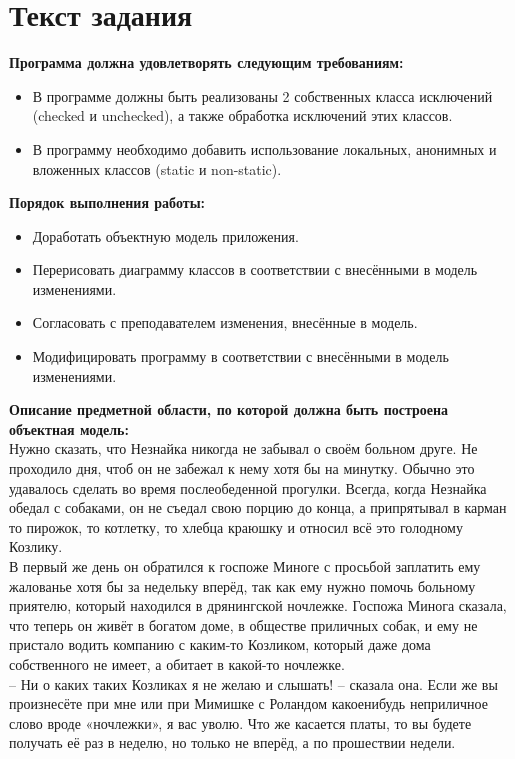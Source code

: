 \documentclass[12pt,onecolumn]{article}
\begin{document}
\section{Текст задания}
\textbf{Программа должна удовлетворять следующим требованиям:}
\begin{itemize}
  \item В программе должны быть реализованы 2 собственных класса исключений (checked и unchecked), а также обработка исключений этих классов.
  \item В программу необходимо добавить использование локальных, анонимных и вложенных классов (static и non-static).
\end{itemize}
\textbf{Порядок выполнения работы:}
\begin{itemize}
  \item Доработать объектную модель приложения.
  \item Перерисовать диаграмму классов в соответствии с внесёнными в модель изменениями.
  \item Согласовать с преподавателем изменения, внесённые в модель.
  \item Модифицировать программу в соответствии с внесёнными в модель изменениями.
\end{itemize}
\textbf{Описание предметной области, по которой должна быть построена объектная модель:}\\
Нужно сказать, что Незнайка никогда не забывал о своём больном друге. Не проходило дня, чтоб он не забежал к нему хотя бы на минутку. Обычно это удавалось сделать во время послеобеденной прогулки. Всегда, когда Незнайка обедал с собаками, он не съедал свою порцию до конца, а припрятывал в карман то пирожок, то котлетку, то хлебца краюшку и относил всё это голодному Козлику.\\

В первый же день он обратился к госпоже Миноге с просьбой заплатить ему жалованье хотя бы за недельку вперёд, так как ему нужно помочь больному приятелю, который находился в дрянингской ночлежке. Госпожа Минога сказала, что теперь он живёт в богатом доме, в обществе приличных собак, и ему не пристало водить компанию с каким-то Козликом, который даже дома собственного не имеет, а обитает в какой-то ночлежке.\\

– Ни о каких таких Козликах я не желаю и слышать! – сказала она. Если же вы произнесёте при мне или при Мимишке с Роландом какоенибудь неприличное слово вроде «ночлежки», я вас уволю. Что же касается платы, то вы будете получать её раз в неделю, но только не вперёд, а по прошествии недели.\\
\newpage
\end{document}
